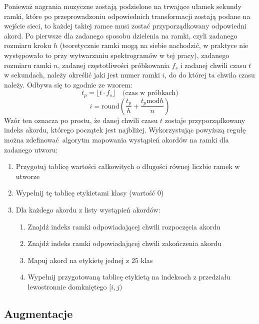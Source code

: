 Ponieważ nagrania muzyczne zostają podzielone na trwające ułamek sekundy ramki, które po
przeprowadzoniu odpowiednich transformacji zostają podane na wejście sieci, to każdej takiej ramce
musi zostać przyporządkowany odpowiedni akord. Po pierwsze dla zadanego sposobu dzielenia na ramki,
czyli zadanego rozmiaru kroku $h$ (teoretycznie ramki mogą na siebie nachodzić, w praktyce nie
występowało to przy wytwarzaniu spektrogramów w tej pracy), zadanego rozmiaru ramki $n$, zadanej
częstotliwości próbkowania $f_s$ i zadanej chwili czasu $t$ w sekundach, należy określić jaki jest
numer ramki $i$, do do której ta chwila czasu należy. Odbywa się to zgodnie ze wzorem:
\begin{equation}
    t_p = \lfloor t \cdot f_s \rfloor \quad \textrm{(czas w próbkach)}
\end{equation}
\begin{equation}
    i = \textrm{round}(\frac{t_p}{h} + \frac{t_p \textrm{mod} h}{n})
\end{equation}
Wzór ten oznacza po prostu, że danej chwili czasu $t$ zostaje przyporządkowany indeks akordu,
którego początek jest najbliżej. Wykorzystując powyższą regułę można zdefinować algorytm mapowania
wystąpień akordów na ramki dla zadanego utworu:
\begin{enumerate}
    \item Przygotuj tablicę wartości całkowitych o długości równej liczbie ramek w utworze
    \item Wypełnij tę tablicę etykietami klasy  (wartość $0$)
    \item Dla każdego akordu z listy wystąpień akordów:
        \begin{enumerate}
            \item Znajdź indeks  ramki odpowiadającej chwili rozpoczęcia akordu
            \item Znajdź indeks  ramki odpowiadającej chwili zakończenia akordu
            \item Mapuj akord na etykietę  jednej z $25$ klas
            \item Wypełnij przygotowaną tablicę etykietą  na indeksach z przedziału
                lewostronnie domkniętego $[i,j)$
        \end{enumerate}
\end{enumerate}

\subsection{Augmentacje}

